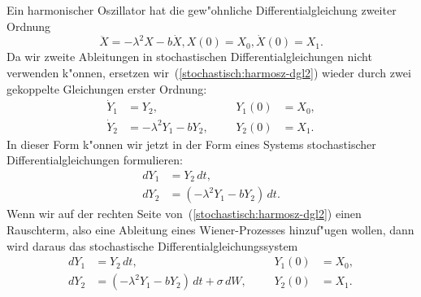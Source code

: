 Ein harmonischer Oszillator hat die gew"ohnliche Differentialgleichung
zweiter Ordnung
\begin{equation}
\ddot X=-\lambda^2 X-b\dot X, X(0)=X_0, \dot X(0)=X_1.
\label{stochastisch:harmosz-dgl2}
\end{equation}
Da wir zweite Ableitungen in stochastischen Differentialgleichungen
nicht verwenden k"onnen, ersetzen wir~(\ref{stochastisch:harmosz-dgl2})
wieder durch zwei gekoppelte Gleichungen erster Ordnung:
\begin{equation}
\begin{aligned}
\dot Y_1&=Y_2,                &&&Y_1(0)&=X_0, \\
\dot Y_2&=-\lambda^2 Y_1-bY_2,&&&Y_2(0)&=X_1.
\end{aligned}
\label{stochastsich:harmosz-dgl1}
\end{equation}
In dieser Form k"onnen wir jetzt in der Form eines Systems stochastischer
Differentialgleichungen formulieren:
\begin{align*}
dY_1&=Y_2\,dt,\\
dY_2&=(-\lambda^2Y_1-bY_2)\,dt.
\end{align*}
Wenn wir auf der rechten Seite von~(\ref{stochastisch:harmosz-dgl2})
einen Rauschterm, also eine Ableitung eines Wiener-Prozesses hinzuf"ugen
wollen, dann wird daraus das stochastische Differentialgleichungssystem
\begin{equation}
\begin{aligned}
dY_1&=Y_2\,dt,                                &&&Y_1(0)&=X_0,\\
dY_2&=(-\lambda^2 Y_1-bY_2)\,dt + \sigma\,dW, &&&Y_2(0)&=X_1.
\end{aligned}
\end{equation}

